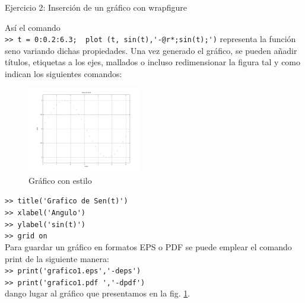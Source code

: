 \documentclass{beamer}
\begin{document}
\begin{frame}[fragile]
\begin{exampleblock}{Ejercicio 2: Inserci\'on de un gr\'afico con wrapfigure}
{\small As\'i el comando
\\%
\verb|>> t = 0:0.2:6.3;  plot (t, sin(t),'-@r*;sin(t);')|
representa la funci\'on seno variando dichas propiedades.
Una vez generado el gr\'afico, se pueden a\~nadir t\'itulos, etiquetas a los ejes, mallados o incluso redimensionar la figura
tal y como indican los siguientes comandos:\\%
\begin{figure}
\begin{center}
\vspace{-30pt}
\includegraphics[width=5cm]{graficos/sin.pdf}
  \end{center}
\vspace{-25pt}
  \caption{{\tiny Gr\'afico con estilo \label{figura:sinestilo1}}}
\end{figure}
\verb|>> title('Grafico de Sen(t)')|
\\%
\verb|>> xlabel('Angulo')|
\\%
\verb|>> ylabel('sin(t)')|
\\%
\verb|>> grid on|
\\%

Para guardar un gr\'afico en formatos EPS o PDF se puede emplear el comando print de la siguiente manera:
\\
\verb|>> print('grafico1.eps','-deps')| \\
\verb|>> print('grafico1.pdf ','-dpdf')| \\
dango lugar al gr\'afico que presentamos en la fig. \ref{figura:sinestilo1}.
}
\end{exampleblock}
\end{frame}

\end{document}
